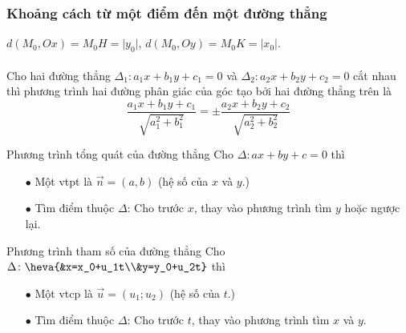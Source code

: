\subsubsection{ Khoảng cách từ một điểm đến một đường thẳng}
\iconMT {} $d\left(M_0,Ox \right)=M_0H=\big|y_0\big|$, \quad $d\left(M_0,Oy \right)=M_0K=\big|x_0\big|$. \\
\iconMT {}\\
Cho hai đường thẳng $\Delta_1\colon a_1x+b_1y+c_1=0$ và ${\Delta}_2\colon a_2x+b_2y+c_2=0$ cắt nhau thì phương trình hai đường phân giác của góc tạo bởi hai đường thẳng trên là
	$$\dfrac{a_1x+b_1y+c_1}{\sqrt{a_1^2+b_1^2}}=\pm \dfrac{a_2x+b_2y+c_2}{\sqrt{a_2^2+b_2^2}}$$

\begin{dang}{Phương trình tổng quát của đường thẳng}
	 Cho $\Delta \colon ax+by+c=0$ thì
	\begin{itemize}
		\item [$\bullet$] Một vtpt là $\overrightarrow{n}=(a,b)$ (hệ số của $x$ và $y$.)
		\item [$\bullet$] Tìm điểm thuộc $\Delta$: Cho trước $x$, thay vào phương trình tìm $y$ hoặc ngược lại.
	\end{itemize}
\end{dang}

\begin{dang}{Phương trình tham số của đường thẳng}
	 Cho $\Delta \colon \heva{&x=x_0+u_1t\\&y=y_0+u_2t}$ thì
	\begin{itemize}
		\item [$\bullet$] Một vtcp là $\overrightarrow{u}=(u_1;u_2)$ (hệ số của $t$.)
		\item [$\bullet$] Tìm điểm thuộc $\Delta$: Cho trước $t$, thay vào phương trình tìm $x$ và $y$.
	\end{itemize}
	
\end{dang}

